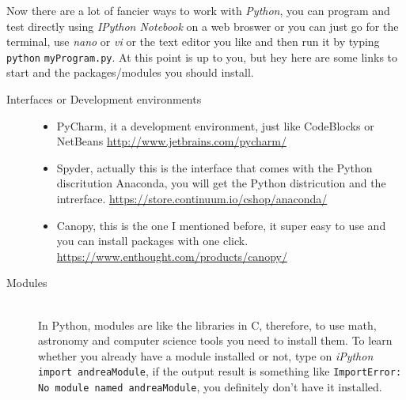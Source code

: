 \documentclass[11pt,fleqn]{book} %
\begin{document}
\begin{description}
    Now there are a lot of fancier ways to work with \emph{Python}, you can program and test directly using \emph{IPython Notebook} on a web broswer or you can just go for the terminal, use \emph{nano} or \emph{vi} or the text editor you like and then run it by typing \verb|python| \verb|myProgram.py|. At this point is up to you, but hey here are some links to start and the packages/modules you should install.
    
    \begin{description}
    	\item[Interfaces or Development environments]\hfill
        	\begin{itemize}
            	\item PyCharm, it a development environment, just like CodeBlocks or NetBeans \url{http://www.jetbrains.com/pycharm/}
                \item Spyder, actually this is the interface that comes with the Python discritution Anaconda, you will get the Python districution and the intrerface. \url{https://store.continuum.io/cshop/anaconda/}
                \item Canopy, this is the one I mentioned before, it super easy to use and you can install packages with one click. \url{https://www.enthought.com/products/canopy/}
            \end{itemize}
        \item[Modules]\hfill
        \\
        In Python, modules are like the libraries in C, therefore, to use math, astronomy and computer science tools you need to install them. To learn whether you already have a module installed or not, type on \emph{iPython} \verb|import andreaModule|, if the output result is something like \verb|ImportError: No module named andreaModule|, you definitely don't have it installed. 
        

\end{description}
\end{description}
\end{document}
